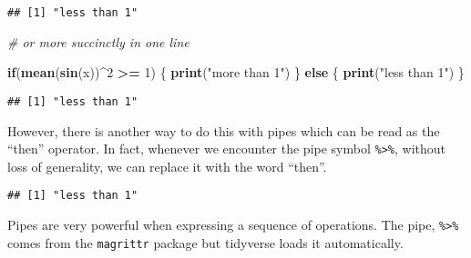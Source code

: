\documentclass[11pt,]{article}
\newenvironment{Shaded}{\begin{snugshade}}{\end{snugshade}}
\newcommand{\KeywordTok}[1]{\textcolor[rgb]{0.13,0.29,0.53}{\textbf{#1}}}
\newcommand{\DecValTok}[1]{\textcolor[rgb]{0.00,0.00,0.81}{#1}}
\newcommand{\StringTok}[1]{\textcolor[rgb]{0.31,0.60,0.02}{#1}}
\newcommand{\CommentTok}[1]{\textcolor[rgb]{0.56,0.35,0.01}{\textit{#1}}}
\newcommand{\ControlFlowTok}[1]{\textcolor[rgb]{0.13,0.29,0.53}{\textbf{#1}}}
\newcommand{\OperatorTok}[1]{\textcolor[rgb]{0.81,0.36,0.00}{\textbf{#1}}}
\newcommand{\NormalTok}[1]{#1}
\begin{document}
\begin{verbatim}
## [1] "less than 1"
\end{verbatim}

\begin{Shaded}
\begin{Highlighting}[]
\CommentTok{# or more succinctly in one line}

\ControlFlowTok{if}\NormalTok{(}\KeywordTok{mean}\NormalTok{(}\KeywordTok{sin}\NormalTok{(x))}\OperatorTok{^}\DecValTok{2} \OperatorTok{>=}\StringTok{ }\DecValTok{1}\NormalTok{)}
\NormalTok{\{}
  \KeywordTok{print}\NormalTok{(}\StringTok{"more than 1"}\NormalTok{)}
\NormalTok{\} }\ControlFlowTok{else}
\NormalTok{\{}
  \KeywordTok{print}\NormalTok{(}\StringTok{"less than 1"}\NormalTok{)}
\NormalTok{\}}
\end{Highlighting}
\end{Shaded}

\begin{verbatim}
## [1] "less than 1"
\end{verbatim}

However, there is another way to do this with pipes which can be read as
the ``then'' operator. In fact, whenever we encounter the pipe symbol
\texttt{\%\textgreater{}\%}, without loss of generality, we can replace
it with the word ``then''.

\begin{Shaded}
\end{Shaded}

\begin{verbatim}
## [1] "less than 1"
\end{verbatim}

Pipes are very powerful when expressing a sequence of operations. The
pipe, \texttt{\%\textgreater{}\%} comes from the \texttt{magrittr}
package but tidyverse loads it automatically.
\end{document}
